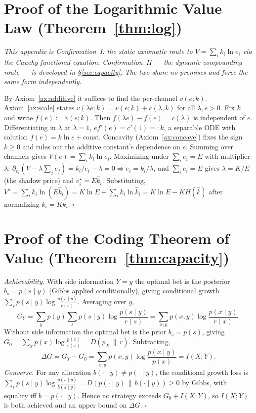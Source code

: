 \documentclass[11pt]{article}
\theoremstyle{plain}
\theoremstyle{definition}
\theoremstyle{remark}
\newcommand{\KL}[2]{D\!\left(#1\,\|\,#2\right)}
\newcommand{\I}{I}
\begin{document}
\appendix
\section{Proof of the Logarithmic Value Law (Theorem~\ref{thm:log})}\label{app:log}

\emph{This appendix is Confirmation~I: the static axiomatic route to $V=\sum_i k_i\ln e_i$ via the Cauchy
functional equation. Confirmation~II --- the dynamic compounding route --- is developed in
\S\ref{sec:capacity}. The two share no premises and force the same form independently.}

By Axiom~\ref{ax:additive} it suffices to find the per-channel $v(e;k)$. Axiom~\ref{ax:scale} states
$v(\lambda e;k)=v(e;k)+c(\lambda,k)$ for all $\lambda,e>0$. Fix $k$ and write $f(e):=v(e;k)$. Then
$f(\lambda e)-f(e)=c(\lambda)$ is independent of $e$. Differentiating in $\lambda$ at $\lambda=1$,
$e f'(e)=c'(1)=:k$, a separable ODE with solution $f(e)=k\ln e+\text{const}$. Concavity (Axiom~\ref{ax:concave})
fixes the sign $k\ge 0$ and rules out the additive constant's dependence on $e$. Summing over channels gives
$V(e)=\sum_i k_i\ln e_i$. Maximizing under $\sum_i e_i=E$ with multiplier $\lambda$: $\partial_{e_i}(V-\lambda
\sum_j e_j)=k_i/e_i-\lambda=0\Rightarrow e_i=k_i/\lambda$, and $\sum_i e_i=E$ gives $\lambda=K/E$ (the shadow
price) and $e_i^\star=E\hat k_i$. Substituting, $V^\star=\sum_i k_i\ln(E\hat k_i)=K\ln E+\sum_i k_i\ln\hat k_i
=K\ln E-K H(\hat k)$ after normalizing $k_i=K\hat k_i$. \hfill$\square$

\section{Proof of the Coding Theorem of Value (Theorem~\ref{thm:capacity})}\label{app:capacity}

\emph{Achievability.} With side information $Y=y$ the optimal bet is the posterior $b_s=p(s\mid y)$ (Gibbs
applied conditionally), giving conditional growth $\sum_s p(s\mid y)\log\frac{p(s\mid y)}{r(s)}$. Averaging over
$y$,
\[
G_Y=\sum_{y}p(y)\sum_s p(s\mid y)\log\frac{p(s\mid y)}{r(s)}
   =\sum_{x,y}p(x,y)\log\frac{p(x\mid y)}{r(x)}.
\]
Without side information the optimal bet is the prior $b_s=p(s)$, giving $G_0=\sum_x p(x)\log\frac{p(x)}{r(x)}
=\KL{p_X}{r}$. Subtracting,
\[
\Delta G=G_Y-G_0=\sum_{x,y}p(x,y)\log\frac{p(x\mid y)}{p(x)}=\I(X;Y).
\]
\emph{Converse.} For any allocation $b(\cdot\mid y)\ne p(\cdot\mid y)$, the conditional growth loss is
$\sum_s p(s\mid y)\log\frac{p(s\mid y)}{b(s\mid y)}=\KL{p(\cdot\mid y)}{b(\cdot\mid y)}\ge 0$ by Gibbs, with
equality iff $b=p(\cdot\mid y)$. Hence no strategy exceeds $G_0+\I(X;Y)$, so $\I(X;Y)$ is both achieved and an
upper bound on $\Delta G$. \hfill$\square$



\end{document}
